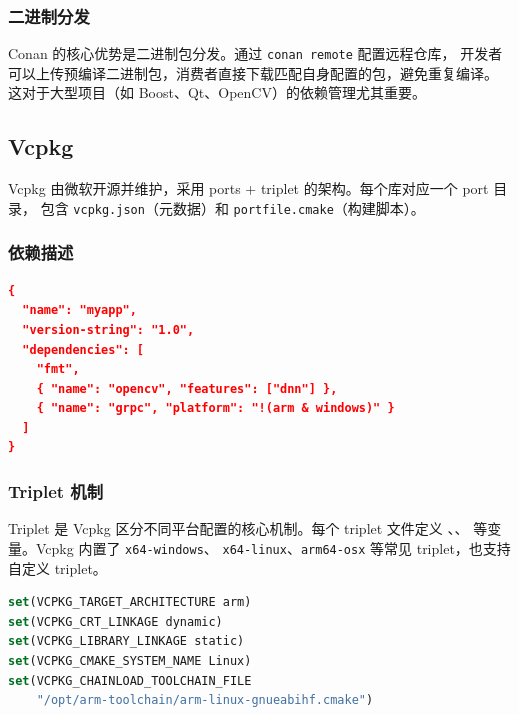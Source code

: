 \documentclass[12pt,a4paper,fontset=fandol]{ctexbook}
\begin{document}
\subsubsection*{二进制分发}

Conan 的核心优势是二进制包分发。通过 \texttt{conan remote} 配置远程仓库，
开发者可以上传预编译二进制包，消费者直接下载匹配自身配置的包，避免重复编译。
这对于大型项目（如 Boost、Qt、OpenCV）的依赖管理尤其重要。

\subsection{Vcpkg}

Vcpkg 由微软开源并维护，采用 ports + triplet 的架构。每个库对应一个 port 目录，
包含 \texttt{vcpkg.json}（元数据）和 \texttt{portfile.cmake}（构建脚本）。

\subsubsection*{依赖描述}

\begin{lstlisting}[language=CMake, caption={vcpkg.json 示例}]
{
  "name": "myapp",
  "version-string": "1.0",
  "dependencies": [
    "fmt",
    { "name": "opencv", "features": ["dnn"] },
    { "name": "grpc", "platform": "!(arm & windows)" }
  ]
}
\end{lstlisting}

\subsubsection*{Triplet 机制}

Triplet 是 Vcpkg 区分不同平台配置的核心机制。每个 triplet 文件定义
\texttt{}、\texttt{}、
\texttt{} 等变量。Vcpkg 内置了 \texttt{x64-windows}、
\texttt{x64-linux}、\texttt{arm64-osx} 等常见 triplet，也支持自定义 triplet。

\begin{lstlisting}[language=CMake, caption={自定义 triplet 示例: arm-linux-custom.cmake}]
set(VCPKG_TARGET_ARCHITECTURE arm)
set(VCPKG_CRT_LINKAGE dynamic)
set(VCPKG_LIBRARY_LINKAGE static)
set(VCPKG_CMAKE_SYSTEM_NAME Linux)
set(VCPKG_CHAINLOAD_TOOLCHAIN_FILE
    "/opt/arm-toolchain/arm-linux-gnueabihf.cmake")
\end{lstlisting}
\end{document}
